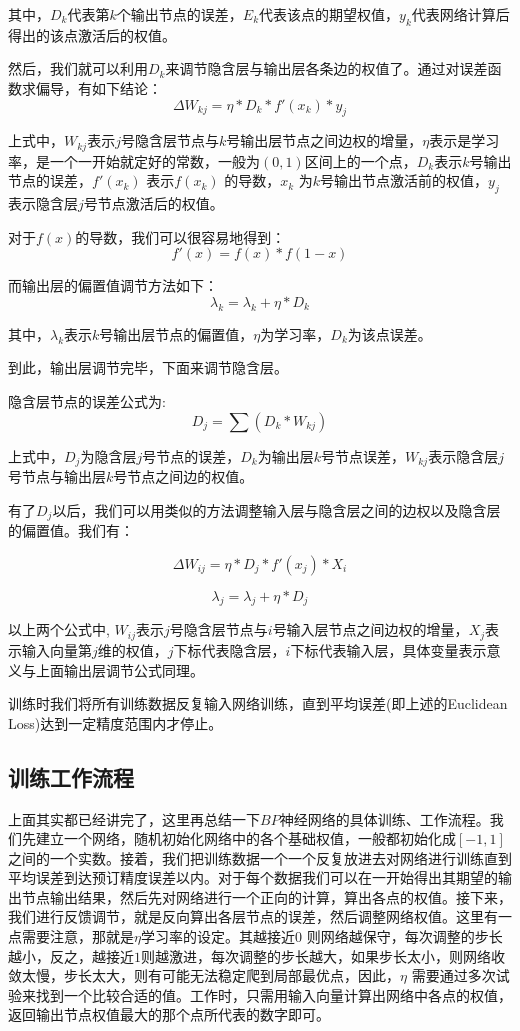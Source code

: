 ﻿\documentclass[UTF8]{ctexart}
\begin{document}
其中，$D_k$代表第$k$个输出节点的误差，$E_k$代表该点的期望权值，$y_k$代表网络计算后得出的该点激活后的权值。\par
然后，我们就可以利用$D_k$来调节隐含层与输出层各条边的权值了。通过对误差函数求偏导，有如下结论：
$$\Delta W_{kj} = \eta * D_k * f'(x_k) * y_j$$ \par
上式中，$W_{kj}$表示$j$号隐含层节点与$k$号输出层节点之间边权的增量，$\eta$表示是学习率，是一个一开始就定好的常数，一般为$(0,1)$区间上的一个点，$D_k$表示$k$号输出节点的误差，$f'(x_k)$ 表示$f(x_k)$ 的导数，$x_k$ 为$k$号输出节点激活前的权值，$y_j$表示隐含层$j$号节点激活后的权值。\par
对于$f(x)$的导数，我们可以很容易地得到：
$$f'(x) = f(x) * f(1 - x)$$ \par
而输出层的偏置值调节方法如下：
$$\lambda _k = \lambda _k + \eta * D_k$$ \par
其中，$\lambda _k$表示$k$号输出层节点的偏置值，$\eta$为学习率，$D_k$为该点误差。\par
到此，输出层调节完毕，下面来调节隐含层。\par
隐含层节点的误差公式为:
$$D_j = \sum (D_k * W_{kj})$$ \par
上式中，$D_j$为隐含层$j$号节点的误差，$D_k$为输出层$k$号节点误差，$W_{kj}$表示隐含层$j$号节点与输出层$k$号节点之间边的权值。\par
有了$D_j$以后，我们可以用类似的方法调整输入层与隐含层之间的边权以及隐含层的偏置值。我们有：\par
$$\Delta W_{ij} = \eta * D_j * f'(x_j) * X_i$$ \par
$$\lambda _j = \lambda _j + \eta * D_j$$ \par
以上两个公式中, $W_{ij}$表示$j$号隐含层节点与$i$号输入层节点之间边权的增量，$X_j$表示输入向量第$j$维的权值，$j$下标代表隐含层，$i$下标代表输入层，具体变量表示意义与上面输出层调节公式同理。\par
训练时我们将所有训练数据反复输入网络训练，直到平均误差(即上述的Euclidean Loss)达到一定精度范围内才停止。
    \subsection{训练工作流程}
上面其实都已经讲完了，这里再总结一下$BP$神经网络的具体训练、工作流程。我们先建立一个网络，随机初始化网络中的各个基础权值，一般都初始化成$[-1,1]$之间的一个实数。接着，我们把训练数据一个一个反复放进去对网络进行训练直到平均误差到达预订精度误差以内。对于每个数据我们可以在一开始得出其期望的输出节点输出结果，然后先对网络进行一个正向的计算，算出各点的权值。接下来，我们进行反馈调节，就是反向算出各层节点的误差，然后调整网络权值。这里有一点需要注意，那就是$\eta$学习率的设定。其越接近$0$ 则网络越保守，每次调整的步长越小，反之，越接近$1$则越激进，每次调整的步长越大，如果步长太小，则网络收敛太慢，步长太大，则有可能无法稳定爬到局部最优点，因此，$\eta$ 需要通过多次试验来找到一个比较合适的值。工作时，只需用输入向量计算出网络中各点的权值，返回输出节点权值最大的那个点所代表的数字即可。
\end{document}
